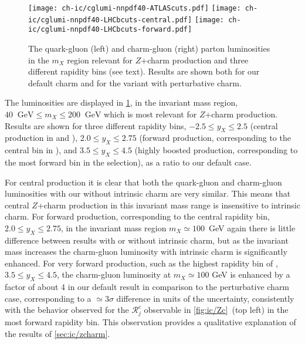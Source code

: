\begin{figure}[htbp]
  \begin{center}
    \texttt{[image: ch-ic/cglumi-nnpdf40-ATLAScuts.pdf]}
    \texttt{[image: ch-ic/cglumi-nnpdf40-LHCbcuts-central.pdf]}
    \texttt{[image: ch-ic/cglumi-nnpdf40-LHCbcuts-forward.pdf]}
    \caption{\small The quark-gluon (left) and charm-gluon (right)
      parton luminosities in the  $m_X$ region
      relevant for $Z$+charm production and  three different
      rapidity bins (see text). Results are shown both for our default charm
    \pdfs and for the variant with perturbative charm. 
  \label{fig:ic/charm_luminosities} }
\end{center}
\end{figure}

The luminosities are displayed in \cref{fig:ic/charm_luminosities},
in the  invariant mass region,
$40~\textrm{ GeV}\le m_X \le 200~\textrm{ GeV}$ which is most relevant for
$Z$+charm production.
%
Results are shown 
for three different
rapidity bins, $-2.5 \le y_X \le 2.5$ (central production in \atlas and \cms),
$2.0 \le y_X \le 2.75$ (forward production, corresponding to the
central bin in \lhcb),
and $3.5 \le y_X \le 4.5$ (highly boosted production, corresponding to
the most forward bin in the \lhcb selection), as a ratio to our default case.

For central production it is clear that both the quark-gluon and
charm-gluon luminosities with our without intrinsic charm are very similar.
This means that central $Z$+charm production in this invariant mass
range is insensitive to intrinsic charm.
%
For forward production, corresponding to the  central \lhcb rapidity
bin, $2.0 \le y_X \le 2.75$, in the invariant mass region  $m_X\simeq
100$~GeV again there is little difference between results with or
without intrinsic charm, but as the invariant mass increases the
charm-gluon luminosity with intrinsic charm is significantly enhanced.
%
For very forward production, such as the highest rapidity bin of \lhcb,
$3.5 \le y_X \le 4.5$, the charm-gluon luminosity 
at $m_X \simeq 100$ GeV is enhanced  by a factor of about 4 in our
default result in comparison to the perturbative charm case, corresponding
to a $\simeq 3\sigma$ difference in units of the \pdf uncertainty,
consistently with the behavior observed for the 
$\mathcal{R}_j^c$ observable in \cref{fig:ic/Zc}~(top left) in the
most forward rapidity  bin.
%
This observation provides a qualitative explanation of
the results of \cref{sec:ic/zcharm}.

